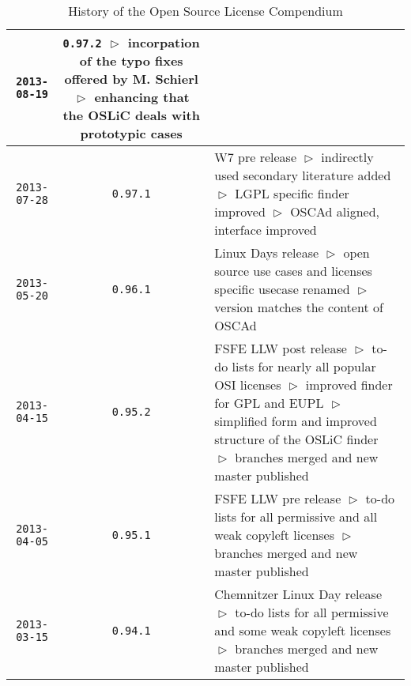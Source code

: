 \begin{table}
\footnotesize
\caption{History of the Open Source License Compendium}
\begin{center}
\begin{tabular}{|r|c|p{10cm}|}
\hline
\hline
    \texttt{2013-08-19}
  & \texttt{0.97.2}
    $\vartriangleright$ incorpation of the typo fixes offered by M.
    Schierl\newline
    $\vartriangleright$ enhancing that the OSLiC deals with prototypic cases\\
\hline
    \texttt{2013-07-28}
  & \texttt{0.97.1} 
  & W7 pre release\newline
    $\vartriangleright$ indirectly used secondary literature added\newline
    $\vartriangleright$ LGPL specific finder improved\newline
    $\vartriangleright$ OSCAd aligned, interface improved\\
\hline
    \texttt{2013-05-20}
  & \texttt{0.96.1} 
  & Linux Days release\newline    
    $\vartriangleright$ open source use cases and licenses specific usecase renamed\newline
    $\vartriangleright$ version matches the content of OSCAd\\
\hline
    \texttt{2013-04-15}
  & \texttt{0.95.2} 
  & FSFE LLW post release\newline
    $\vartriangleright$ to-do lists for nearly all popular OSI licenses\newline
    $\vartriangleright$ improved finder for GPL and EUPL\newline
    $\vartriangleright$ simplified form and improved structure of the OSLiC finder\newline    
    $\vartriangleright$ branches merged and new master published\\
\hline
    \texttt{2013-04-05}
  & \texttt{0.95.1} 
  & FSFE LLW pre release\newline
    $\vartriangleright$ to-do lists for all permissive and all weak copyleft licenses\newline
    $\vartriangleright$ branches merged and new master published\\
\hline
    \texttt{2013-03-15}
  & \texttt{0.94.1} 
  & Chemnitzer Linux Day release\newline
    $\vartriangleright$ to-do lists for all permissive and some weak copyleft licenses\newline
    $\vartriangleright$ branches merged and new master published\\

\end{tabular}
\end{center}
\end{table}

